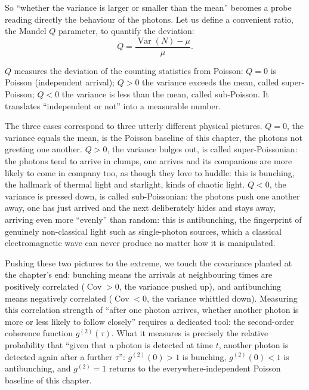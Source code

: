 So ``whether the variance is larger or smaller than the mean'' becomes a probe reading directly the behaviour of the photons. Let us define a convenient ratio, the Mandel $Q$ parameter, to quantify the deviation:
\begin{equation}
  Q=\frac{\operatorname{Var}(N)-\mu}{\mu}.
  \label{eq:e03-mandelQ}
\end{equation}
\begin{formulaexplain}
$Q$ measures the deviation of the counting statistics from Poisson: $Q=0$ is Poisson (independent arrival); $Q>0$ the variance exceeds the mean, called super-Poisson; $Q<0$ the variance is less than the mean, called sub-Poisson. It translates ``independent or not'' into a measurable number.
\end{formulaexplain}
The three cases correspond to three utterly different physical pictures. $Q=0$, the variance equals the mean, is the Poisson baseline of this chapter, the photons not greeting one another. $Q>0$, the variance bulges out, is called super-Poissonian: the photons tend to arrive in clumps, one arrives and its companions are more likely to come in company too, as though they love to huddle: this is bunching, the hallmark of thermal light and starlight, kinds of chaotic light. $Q<0$, the variance is pressed down, is called sub-Poissonian: the photons push one another away, one has just arrived and the next deliberately hides and stays away, arriving even more ``evenly'' than random: this is antibunching, the fingerprint of genuinely non-classical light such as single-photon sources, which a classical electromagnetic wave can never produce no matter how it is manipulated.

Pushing these two pictures to the extreme, we touch the covariance planted at the chapter's end: bunching means the arrivals at neighbouring times are positively correlated ($\operatorname{Cov}>0$, the variance pushed up), and antibunching means negatively correlated ($\operatorname{Cov}<0$, the variance whittled down). Measuring this correlation strength of ``after one photon arrives, whether another photon is more or less likely to follow closely'' requires a dedicated tool: the second-order coherence function $g^{(2)}(\tau)$. What it measures is precisely the relative probability that ``given that a photon is detected at time $t$, another photon is detected again after a further $\tau$'': $g^{(2)}(0)>1$ is bunching, $g^{(2)}(0)<1$ is antibunching, and $g^{(2)}=1$ returns to the everywhere-independent Poisson baseline of this chapter.

